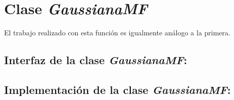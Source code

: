 \documentclass[letterpaper,12pt,openany,oneside]{book}
\begin{document}
\section{Clase \textit{GaussianaMF}}
El trabajo realizado con esta función es igualmente análogo a la primera.

\subsection{Interfaz de la clase \emph{GaussianaMF}:}


\subsection{Implementación de la clase \emph{GaussianaMF}:}

\pagebreak
\end{document}
